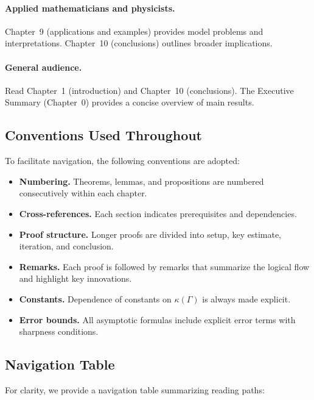 \paragraph{Applied mathematicians and physicists.}
Chapter~9 (applications and examples) provides model problems and
interpretations. Chapter~10 (conclusions) outlines broader implications.

\paragraph{General audience.}
Read Chapter~1 (introduction) and Chapter~10 (conclusions). The Executive
Summary (Chapter~0) provides a concise overview of main results.

\subsection{Conventions Used Throughout}

To facilitate navigation, the following conventions are adopted:

\begin{itemize}
  \item \textbf{Numbering.} Theorems, lemmas, and propositions are numbered
  consecutively within each chapter.
  \item \textbf{Cross-references.} Each section indicates prerequisites and
  dependencies.
  \item \textbf{Proof structure.} Longer proofs are divided into setup, key
  estimate, iteration, and conclusion.
  \item \textbf{Remarks.} Each proof is followed by remarks that summarize the
  logical flow and highlight key innovations.
  \item \textbf{Constants.} Dependence of constants on $\kappa(\Gamma)$ is
  always made explicit.
  \item \textbf{Error bounds.} All asymptotic formulas include explicit error
  terms with sharpness conditions.
\end{itemize}

\subsection{Navigation Table}

For clarity, we provide a navigation table summarizing reading paths:

